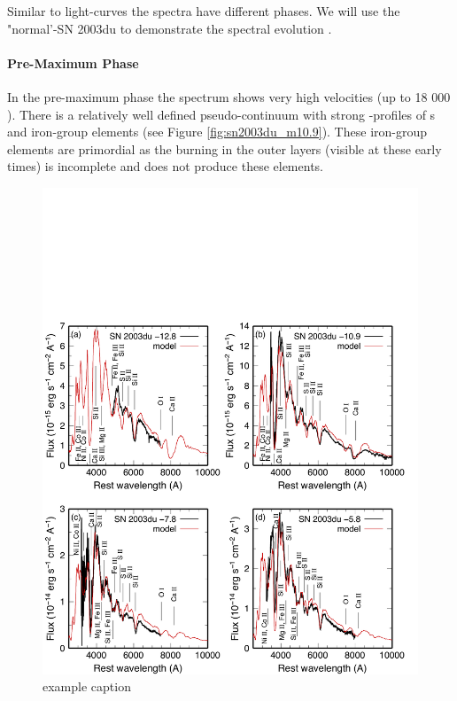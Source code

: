 Similar to light-curves the spectra have different phases. We will use the "normal'-\snia SN 2003du to demonstrate the spectral evolution \citep{2011MNRAS.410.1725T}. 
\paragraph{Pre-Maximum Phase}
In the pre-maximum phase the spectrum shows very high velocities (up to 18 000 \kms). There is a relatively well defined pseudo-continuum with strong \pcygni-profiles of \ime s and iron-group elements (see Figure \ref{fig:sn2003du_m10.9}). These iron-group elements are primordial as the burning in the outer layers (visible at these early times) is incomplete and does not produce these elements. 
\begin{figure}[htbp] %
   \centering
   \includegraphics[width=\textwidth]{chapter1/plots/sn2003du_t-10.pdf} 
   \caption{example caption}
   \label{fig:sn2003du_t-10}
\end{figure}

